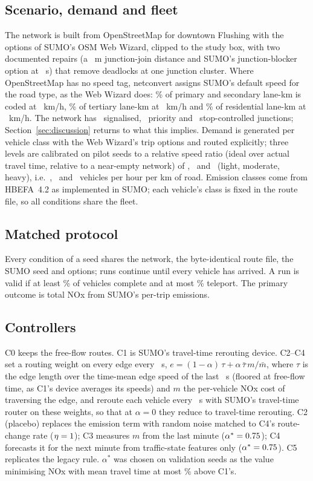 \documentclass[11pt]{article}
\begin{document}
\subsection{Scenario, demand and fleet}
The network is built from OpenStreetMap for downtown Flushing with the options of SUMO's OSM Web Wizard, clipped to
the study box, with two documented repairs (a \JunctionJoinM~m junction-join distance and SUMO's junction-blocker option at \JunctionBlockerS~s) that
remove deadlocks at one junction cluster. Where OpenStreetMap has no speed tag, netconvert assigns SUMO's default
speed for the road type, as the Web Wizard does: \SpeedSharePrimSec\% of primary and secondary lane-km is coded at
\SpeedPrimSec~km/h, \SpeedShareTertiary\% of tertiary lane-km at \SpeedTertiary~km/h and \SpeedShareResid\% of
residential lane-km at \SpeedResid~km/h. The network has \JunctionsSignal\ signalised, \JunctionsPriority\ priority
and \JunctionsStop\ stop-controlled junctions; Section~\ref{sec:discussion} returns to what this implies. Demand is generated per vehicle class with the Web Wizard's trip
options and routed explicitly; three levels are calibrated on pilot seeds to a relative speed ratio (ideal over
actual travel time, relative to a near-empty network) of \RsrLight, \RsrModerate\ and \RsrHeavy\ (light,
moderate, heavy), i.e.\ \DensityLight, \DensityModerate\ and \DensityHeavy\ vehicles per hour per km of road.
Emission classes come from HBEFA~4.2 as implemented in SUMO; each vehicle's class is fixed in the route file, so all
conditions share the fleet.

\subsection{Matched protocol}
Every condition of a seed shares the network, the byte-identical route file, the SUMO seed and options; runs
continue until every vehicle has arrived. A run is valid if at least \ValidCompletionPct\% of vehicles complete and at most
\ValidTeleportPct\% teleport. The primary outcome is total NOx from SUMO's per-trip emissions.

\subsection{Controllers}
C0 keeps the free-flow routes. C1 is SUMO's travel-time rerouting device. C2--C4 set a routing weight on every
edge every \ReroutePeriodS~s, $e = (1-\alpha)\,\tau + \alpha\,\bar\tau\,m/\bar m$, where $\tau$ is the edge length over the
time-mean edge speed of the last \TauAvgS~s (floored at free-flow time, as C1's device averages its speeds) and
$m$ the per-vehicle NOx cost of traversing the edge, and reroute each vehicle every \ReroutePeriodS~s with SUMO's travel-time
router on these weights, so that at $\alpha = 0$ they reduce to travel-time rerouting. C2 (placebo) replaces the
emission term with random noise matched to C4's route-change rate ($\eta = 1$); C3 measures $m$ from the
last minute ($\alpha^* = 0.75$); C4 forecasts it for the next minute from traffic-state features only
($\alpha^* = 0.75$). C5 replicates the legacy rule. $\alpha^*$ was chosen on validation seeds as the value
minimising NOx with mean travel time at most \AlphaTTBudgetPct\% above C1's.
\end{document}
